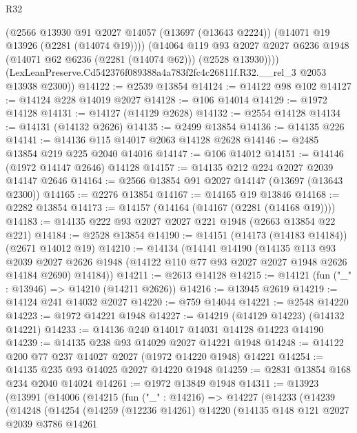 \begin{lexlean}{R32}
\begin{coremodule}
          (@2566
            @13930
            @91
            @2027
            @14057
            (@13697 (@13643 @2224))
            (@14071 @19 @13926 (@2281 (@14074 @19))))
          (@14064
            @119
            @93
            @2027
            @2027
            @6236
            @1948
            (@14071 @62 @6236 (@2281 (@14074 @62)))
            (@2528 @13930))))
      (LexLeanPreserve.Cd542376f089388a4a783f2fc4c26811f.R32.__rel_3 @2053 @13938 @2300))
@14122 := @2539 @13854
@14124 := @14122 @98 @102
@14127 := @14124 @228 @14019 @2027
@14128 := @106 @14014
@14129 := @1972 @14128
@14131 := @14127 (@14129 @2628)
@14132 := @2554 @14128
@14134 := @14131 (@14132 @2626)
@14135 := @2499 @13854
@14136 := @14135 @226
@14141 := @14136 @115 @14017 @2063 @14128 @2628
@14146 := @2485 @13854 @219 @225 @2040 @14016
@14147 := @106 @14012
@14151 := @14146 (@1972 @14147 @2646) @14128
@14157 := @14135 @212 @224 @2027 @2039 @14147 @2646
@14164 := @2566 @13854 @91 @2027 @14147 (@13697 (@13643 @2300))
@14165 := @2276 @13854
@14167 := @14165 @19 @13846
@14168 := @2282 @13854
@14173 := @14157 (@14164 (@14167 (@2281 (@14168 @19))))
@14183 := @14135 @222 @93 @2027 @2027 @221 @1948 (@2663 @13854 @22 @221)
@14184 := @2528 @13854
@14190 := @14151 (@14173 (@14183 @14184)) (@2671 @14012 @19)
@14210 := @14134
    (@14141
      @14190
      (@14135
        @113
        @93
        @2039
        @2027
        @2626
        @1948
        (@14122 @110 @77 @93 @2027 @2027 @1948 @2626 @14184 @2690)
        @14184))
@14211 := @2613 @14128
@14215 := @14121 (fun ("_" : @13946) => @14210 (@14211 @2626))
@14216 := @13945 @2619
@14219 := @14124 @241 @14032 @2027
@14220 := @759 @14044
@14221 := @2548 @14220
@14223 := @1972 @14221 @1948
@14227 := @14219 (@14129 @14223) (@14132 @14221)
@14233 := @14136 @240 @14017 @14031 @14128 @14223 @14190
@14239 := @14135 @238 @93 @14029 @2027 @14221 @1948
@14248 := @14122 @200 @77 @237 @14027 @2027 (@1972 @14220 @1948) @14221
@14254 := @14135 @235 @93 @14025 @2027 @14220 @1948
@14259 := @2831 @13854 @168 @234 @2040 @14024
@14261 := @1972 @13849 @1948
@14311 := @13923
    (@13991
      (@14006
        (@14215
          (fun ("_" : @14216) =>
          @14227
            (@14233
              (@14239
                (@14248
                  (@14254
                    (@14259
                      (@12236 @14261)
                      @14220
                      (@14135
                        @148
                        @121
                        @2027
                        @2039
                        @3786
                        @14261

\end{coremodule}
\end{lexlean}
